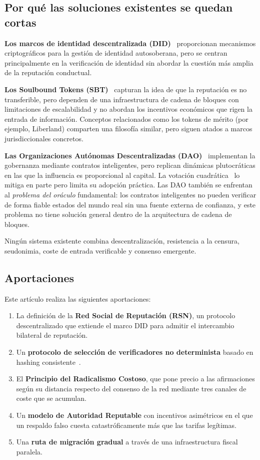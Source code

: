 \documentclass[11pt,a4paper,twocolumn]{article}
\begin{document}
\subsection{Por qué las soluciones existentes se quedan cortas}

\textbf{Los marcos de identidad descentralizada (DID)}~\cite{did2022} proporcionan mecanismos criptográficos para la gestión de identidad autosoberana, pero se centran principalmente en la verificación de identidad sin abordar la cuestión más amplia de la reputación conductual.

\textbf{Los Soulbound Tokens (SBT)}~\cite{weyl2022} capturan la idea de que la reputación es no transferible, pero dependen de una infraestructura de cadena de bloques con limitaciones de escalabilidad y no abordan los incentivos económicos que rigen la entrada de información. Conceptos relacionados como los tokens de mérito (por ejemplo, Liberland) comparten una filosofía similar, pero siguen atados a marcos jurisdiccionales concretos.

\textbf{Las Organizaciones Autónomas Descentralizadas (DAO)}~\cite{buterin2014} implementan la gobernanza mediante contratos inteligentes, pero replican dinámicas plutocráticas en las que la influencia es proporcional al capital. La votación cuadrática~\cite{buterin2019} lo mitiga en parte pero limita su adopción práctica. Las DAO también se enfrentan al \emph{problema del oráculo} fundamental: los contratos inteligentes no pueden verificar de forma fiable estados del mundo real sin una fuente externa de confianza, y este problema no tiene solución general dentro de la arquitectura de cadena de bloques.

Ningún sistema existente combina descentralización, resistencia a la censura, seudonimia, coste de entrada verificable y consenso emergente.

\subsection{Aportaciones}

Este artículo realiza las siguientes aportaciones:
\begin{enumerate}[nosep]
\item La definición de la \textbf{Red Social de Reputación (RSN)}, un protocolo descentralizado que extiende el marco DID para admitir el intercambio bilateral de reputación.
\item Un \textbf{protocolo de selección de verificadores no determinista} basado en hashing consistente~\cite{karger1997}.
\item El \textbf{Principio del Radicalismo Costoso}, que pone precio a las afirmaciones según su distancia respecto del consenso de la red mediante tres canales de coste que se acumulan.
\item Un \textbf{modelo de Autoridad Reputable} con incentivos asimétricos en el que un respaldo falso cuesta catastróficamente más que las tarifas legítimas.
\item Una \textbf{ruta de migración gradual} a través de una infraestructura fiscal paralela.
\end{enumerate}
\end{document}
